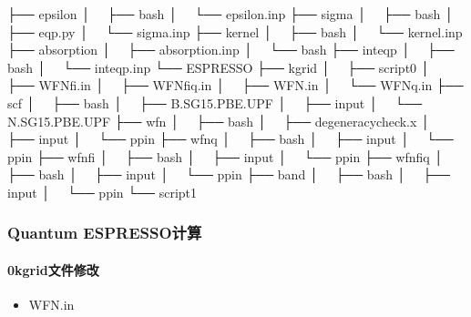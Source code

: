 \documentclass[a4paper,12pt,english]{sphinxmanual}
\begin{document}
\begin{sphinxVerbatim}[commandchars=\\\{\}]
├── \PYGZhy{}epsilon
│   ├── bash
│   └── epsilon.inp
├── \PYGZhy{}sigma
│   ├── bash
│   ├── eqp.py
│   └── sigma.inp
├── \PYGZhy{}kernel
│   ├── bash
│   └── kernel.inp
├── \PYGZhy{}absorption
│   ├── absorption.inp
│   └── bash
├── \PYGZhy{}inteqp
│   ├── bash
│   └── inteqp.inp
└── ESPRESSO
    ├── \PYGZhy{}kgrid
    │   ├── script\PYGZus{}0
    │   ├── WFN\PYGZus{}fi.in
    │   ├── WFN\PYGZus{}fiq.in
    │   ├── WFN.in
    │   └── WFNq.in
    ├── \PYGZhy{}scf
    │   ├── bash
    │   ├── B.SG15.PBE.UPF
    │   ├── input
    │   └── N.SG15.PBE.UPF
    ├── \PYGZhy{}wfn
    │   ├── bash
    │   ├── degeneracy\PYGZus{}check.x
    │   ├── input
    │   └── pp\PYGZus{}in
    ├── \PYGZhy{}wfnq
    │   ├── bash
    │   ├── input
    │   └── pp\PYGZus{}in
    ├── \PYGZhy{}wfn\PYGZus{}fi
    │   ├── bash
    │   ├── input
    │   └── pp\PYGZus{}in
    ├── \PYGZhy{}wfn\PYGZus{}fiq
    │   ├── bash
    │   ├── input
    │   └── pp\PYGZus{}in
    ├── \PYGZhy{}band
    │   ├── bash
    │   ├── input
    │   └── pp\PYGZus{}in
    └── script\PYGZus{}1
\end{sphinxVerbatim}


\subsubsection{Quantum ESPRESSO计算}
\label{\detokenize{tutorials/berkeleygw/gw:quantum-espresso}}

\paragraph{0\sphinxhyphen{}kgrid文件修改}
\label{\detokenize{tutorials/berkeleygw/gw:kgrid}}\begin{itemize}
\item {} 
\sphinxAtStartPar
WFN.in

\end{itemize}
\end{document}
